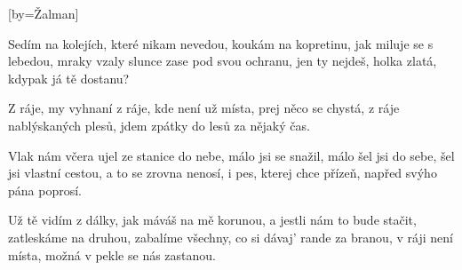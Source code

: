 [by={Žalman}]

\beginverse{}
Sedím na kolejích, které nikam nevedou,  
koukám na kopretinu, jak miluje se s lebedou,  
mraky vzaly slunce zase pod svou ochranu, 
jen ty nejdeš, holka zlatá, kdypak já tě dostanu? 
\endverse{}

\beginchorus{}
Z ráje, my vyhnaní z ráje,
kde není už místa, prej něco se chystá, 
z ráje nablýskaných plesů,
jdem zpátky do lesů za nějaký čas.
\endchorus{}

\beginverse{}
Vlak nám včera ujel ze stanice do nebe,
málo jsi se snažil, málo šel jsi do sebe,
šel jsi vlastní cestou, a to se zrovna nenosí, 
i pes, kterej chce přízeň, napřed svýho pána poprosí. 
\endverse{}

\beginchorus{}
\phantom{}
\endchorus{}

\beginverse{}
Už tě vidím z dálky, jak máváš na mě korunou,
a jestli nám to bude stačit, zatleskáme na druhou,
zabalíme všechny, co si dávaj' rande za branou, 
v ráji není místa, možná v pekle se nás zastanou. 
\endverse{}

\beginchorus{}
\phantom{}
\endchorus{}

\endsong{}
